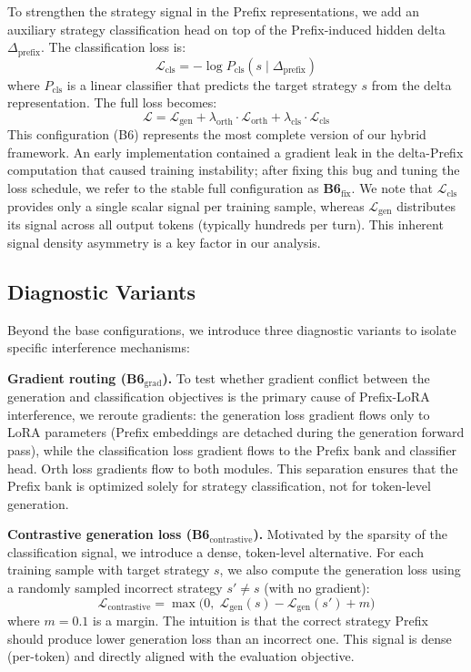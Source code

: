 \documentclass[conference]{IEEEtran}
\begin{document}
To strengthen the strategy signal in the Prefix representations, we add an auxiliary strategy classification head on top of the Prefix-induced hidden delta $\Delta_{\text{prefix}}$. The classification loss is:
\begin{equation}
\mathcal{L}_{\text{cls}} = -\log P_{\text{cls}}(s \mid \Delta_{\text{prefix}})
\end{equation}
where $P_{\text{cls}}$ is a linear classifier that predicts the target strategy $s$ from the delta representation. The full loss becomes:
\begin{equation}
\mathcal{L} = \mathcal{L}_{\text{gen}} + \lambda_{\text{orth}} \cdot \mathcal{L}_{\text{orth}} + \lambda_{\text{cls}} \cdot \mathcal{L}_{\text{cls}}
\end{equation}
This configuration (B6) represents the most complete version of our hybrid framework. An early implementation contained a gradient leak in the delta-Prefix computation that caused training instability; after fixing this bug and tuning the loss schedule, we refer to the stable full configuration as \textbf{B6$_{\text{fix}}$}. We note that $\mathcal{L}_{\text{cls}}$ provides only a single scalar signal per training sample, whereas $\mathcal{L}_{\text{gen}}$ distributes its signal across all output tokens (typically hundreds per turn). This inherent signal density asymmetry is a key factor in our analysis.

\subsection{Diagnostic Variants}

Beyond the base configurations, we introduce three diagnostic variants to isolate specific interference mechanisms:

\textbf{Gradient routing (B6$_{\text{grad}}$).} To test whether gradient conflict between the generation and classification objectives is the primary cause of Prefix-LoRA interference, we reroute gradients: the generation loss gradient flows only to LoRA parameters (Prefix embeddings are detached during the generation forward pass), while the classification loss gradient flows to the Prefix bank and classifier head. Orth loss gradients flow to both modules. This separation ensures that the Prefix bank is optimized solely for strategy classification, not for token-level generation.

\textbf{Contrastive generation loss (B6$_{\text{contrastive}}$).} Motivated by the sparsity of the classification signal, we introduce a dense, token-level alternative. For each training sample with target strategy $s$, we also compute the generation loss using a randomly sampled incorrect strategy $s' \neq s$ (with no gradient):
\begin{equation}
\mathcal{L}_{\text{contrastive}} = \max\!\big(0,\; \mathcal{L}_{\text{gen}}(s) - \mathcal{L}_{\text{gen}}(s') + m\big)
\end{equation}
where $m = 0.1$ is a margin. The intuition is that the correct strategy Prefix should produce lower generation loss than an incorrect one. This signal is dense (per-token) and directly aligned with the evaluation objective.
\end{document}
